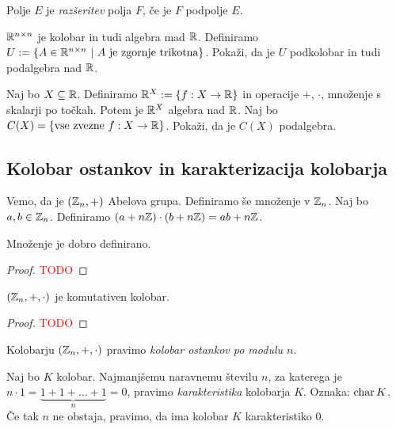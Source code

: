 \begin{definicija}
    Polje $E$ je \emph{razšeritev} polja $F$, če je $F$ podpolje $E$.
\end{definicija}

\begin{primer}
    $\mathbb{R}^{n \times n}$ je kolobar in tudi algebra mad $\mathbb{R}$. Definiramo $U := \left\{A \in \mathbb{R}^{n \times n} \ | \ A \text{ je zgornje trikotna}\right\}$. Pokaži, da je $U$ podkolobar in tudi podalgebra nad $\mathbb{R}$.
\end{primer}

\begin{primer}
    Naj bo $X \subseteq \mathbb{R}$. Definiramo $\mathbb{R}^X := \left\{f: X \to \mathbb{R}\right\}$ in operacije $+$, $\cdot$, množenje s skalarji po točkah. Potem je $\mathbb{R}^X$ algebra nad $\mathbb{R}$. Naj bo $C(X) = \left\{\text{vse zvezne } f: X \to \mathbb{R}\right\}$. Pokaži, da je $C(X)$ podalgebra.
\end{primer}

\subsection{Kolobar ostankov in karakterizacija kolobarja}
Vemo, da je $(\mathbb{Z}_n, +)$ Abelova grupa. Definiramo še množenje v $\mathbb{Z}_n$. Naj bo $a, b \in \mathbb{Z}_n$. Definiramo $(a+n\mathbb{Z}) \cdot (b + n\mathbb{Z}) = ab + n\mathbb{Z}$.

\begin{lema}
    Množenje je dobro definirano.
\end{lema}

\begin{proof}
    \textcolor{red}{TODO}
\end{proof}

\begin{trditev}
    $(\mathbb{Z}_n, +, \cdot)$ je komutativen kolobar.
\end{trditev}

\begin{proof}
    \textcolor{red}{TODO}
\end{proof}

\begin{definicija}
    Kolobarju $(\mathbb{Z}_n, +, \cdot)$ pravimo \emph{kolobar ostankov po modulu $n$}.
\end{definicija}

\begin{definicija}
    Naj bo $K$ kolobar. Najmanjšemu naravnemu številu $n$, za katerega je $n \cdot 1 = \underbrace{1 + 1 + \ldots + 1}_n = 0$, pravimo \emph{karakteristika} kolobarja $K$. Oznaka: $\operatorname{char} K$. Če tak $n$ ne obstaja, pravimo, da ima kolobar $K$ karakteristiko $0$.
\end{definicija}

